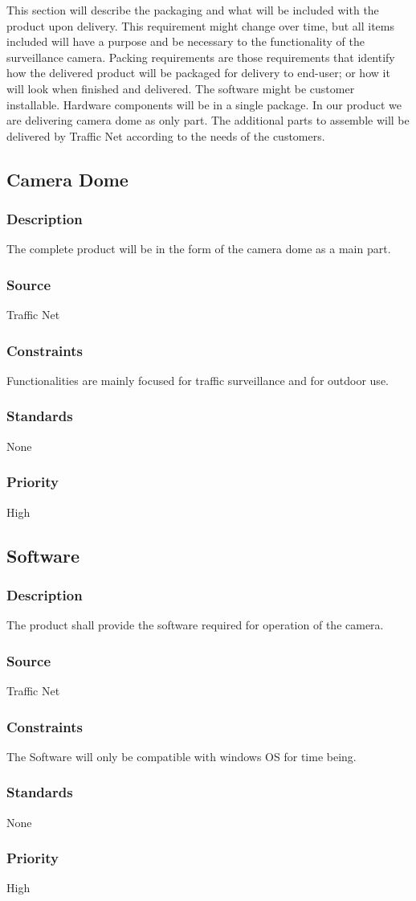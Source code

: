 This section will describe the packaging and what will be included with the product upon delivery. This requirement might change over time, but all items included will have a purpose and be necessary to the functionality of the surveillance camera. Packing requirements are those requirements that identify how the delivered product will be packaged for delivery to end-user; or how it will look when finished and delivered. The software might be customer installable. Hardware components will be in a single package. In our product we are delivering camera dome as only part. The additional parts to assemble will be delivered by Traffic Net according to the needs of the customers.


\subsection{Camera Dome}
\subsubsection{Description}
The complete product will be in the form of the camera dome as a main part.

\subsubsection{Source}
Traffic Net

\subsubsection{Constraints}
Functionalities are mainly focused for traffic surveillance and for outdoor use.

\subsubsection{Standards}
None

\subsubsection{Priority}
High

\subsection{Software}
\subsubsection{Description}
The product shall provide the software required for operation of the camera.

\subsubsection{Source}
Traffic Net
\subsubsection{Constraints}
The Software will only be compatible with windows OS for time being.
\subsubsection{Standards}
None
\subsubsection{Priority}
High
